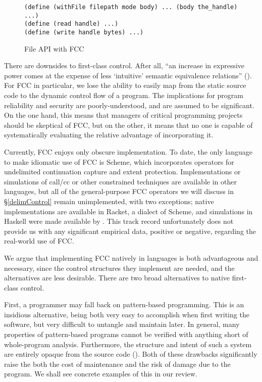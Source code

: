 \documentclass[11pt]{article}
\begin{document}
\begin{figure}[H]
\caption{File API with FCC}
\label{fig:fileAPIFCC}
\begin{verbatim}
(define (withFile filepath mode body) ... (body the_handle) ...)
(define (read handle) ...)
(define (write handle bytes) ...)
\end{verbatim}
\end{figure}

There are downsides to first-class control. After all, ``an increase in expressive power comes at the expense of less `intuitive' semantic equivalence relations'' (\cite{Felleisen90expressive}).
For FCC in particular, we lose the ability to easily map from the static source code to the dynamic control flow of a program.
The implications for program reliability and security are poorly-understood, and are assumed to be significant.
On the one hand, this means that managers of critical programming projects should be skeptical of FCC, but on the other, it means that no one is capable of systematically evaluating the relative advantage of incorporating it.

Currently, FCC enjoys only obscure implementation.
To date, the only language to make idiomatic use of FCC is Scheme, which incorporates operators for undelimited continuation capture and extent protection.
Implementations or simulations of call/cc or other constrained techniques are available in other languages, but all of the general-purpose FCC operators we will discuss in \S\ref{delimControl} remain unimplemented, with two exceptions;
native implementations are available in Racket, a dialect of Scheme, and simulations in Haskell were made available by \cite{MFDC}.
This track record unfortunately does not provide us with any significant empirical data, positive or negative, regarding the real-world use of FCC.

We argue that implementing FCC natively in languages is both advantageous and necessary, since the control structures they implement are needed, and the alternatives are less desirable.
There are two broad alternatives to native first-class control.

First, a programmer may fall back on pattern-based programming.
This is an insidious alternative, being both very easy to accomplish when first writing the software, but very difficult to untangle and maintain later.
In general, many properties of pattern-based programs cannot be verified with anything short of whole-program analysis.
Furthermore, the structure and intent of such a system are entirely opaque from the source code (\cite{Felleisen90expressive}).
Both of these drawbacks significantly raise the both the cost of maintenance and the risk of damage due to the program.
We shall see concrete examples of this in our review.
\end{document}

